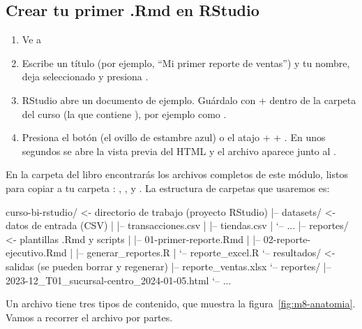\subsection{Crear tu primer .Rmd en RStudio}

\begin{enumerate}
  \item Ve a 
  \item Escribe un título (por ejemplo, ``Mi primer reporte de ventas'') y tu
        nombre, deja seleccionado  y presiona .
  \item RStudio abre un documento de ejemplo. Guárdalo con
         +  dentro de la carpeta del curso (la que
        contiene ), por ejemplo como
        .
  \item Presiona el botón  (el ovillo de estambre azul) o el
        atajo  +  + . En unos segundos se
        abre la vista previa del HTML y el archivo
         aparece junto al .
\end{enumerate}

En la carpeta  del libro encontrarás los archivos
completos de este módulo, listos para copiar a tu carpeta :
, ,
 y . La estructura de
carpetas que usaremos es:

\begin{textocodigo}
curso-bi-rstudio/              <- directorio de trabajo (proyecto RStudio)
|-- datasets/                  <- datos de entrada (CSV)
|   |-- transacciones.csv
|   |-- tiendas.csv
|   `-- ...
|-- reportes/                  <- plantillas .Rmd y scripts
|   |-- 01-primer-reporte.Rmd
|   |-- 02-reporte-ejecutivo.Rmd
|   |-- generar_reportes.R
|   `-- reporte_excel.R
`-- resultados/                <- salidas (se pueden borrar y regenerar)
    |-- reporte_ventas.xlsx
    `-- reportes/
        |-- 2023-12_T01_sucursal-centro_2024-01-05.html
        `-- ...
\end{textocodigo}

Un archivo  tiene tres tipos de contenido, que muestra la
figura~\ref{fig:m8-anatomia}. Vamos a recorrer el archivo
 por partes.

